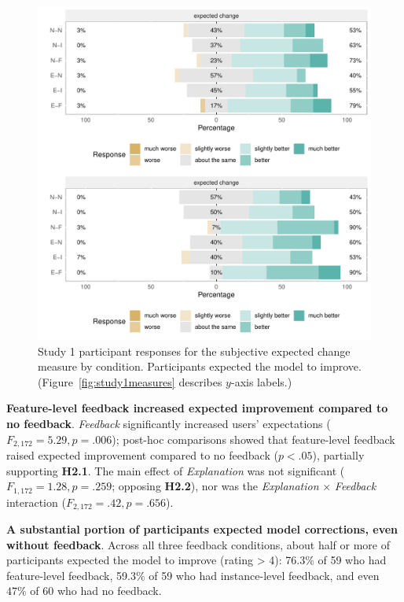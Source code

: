 \begin{figure}
    \centering
    \includegraphics[width=\linewidth]{2020_chi_explanation/figures/exp-plots-study1.pdf}
    \caption{Study 1 participant responses for the subjective expected
change measure by condition. Participants expected
the model to improve. (Figure~\ref{fig:study1measures} describes $y$-axis labels.)}
    \label{fig:study1exp}
\end{figure}

\textbf{Feature-level feedback increased expected improvement compared to no feedback}.
%
\textit{Feedback} significantly increased users' expectations ($F_{2,172}=5.29, p=.006$);  post-hoc comparisons showed that feature-level feedback raised expected improvement compared to no feedback ($p<.05$), partially supporting \textbf{H2.1}. The main effect of \textit{Explanation} was not significant ($F_{1,172}=1.28, p=.259$; opposing \textbf{H2.2}), nor was the \textit{Explanation} $\times$ \textit{Feedback} interaction ($F_{2,172}=.42, p=.656$).

\textbf{A substantial portion of participants expected model corrections, even without feedback}.
%
Across all three feedback conditions, about half or more of participants expected the model to improve (rating > 4): 76.3\% of 59 who had feature-level feedback, 59.3\% of 59 who had instance-level feedback, and even $47\%$ of 60 who had no feedback. 

